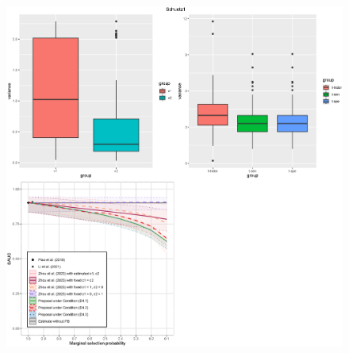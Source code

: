 \documentclass[
]{article}
\begin{document}
\begin{figure}
\begin{center}
\centerline{\includegraphics[width=\textwidth]{var-sch1.eps}}
\end{center}
\end{figure}
\end{document}

